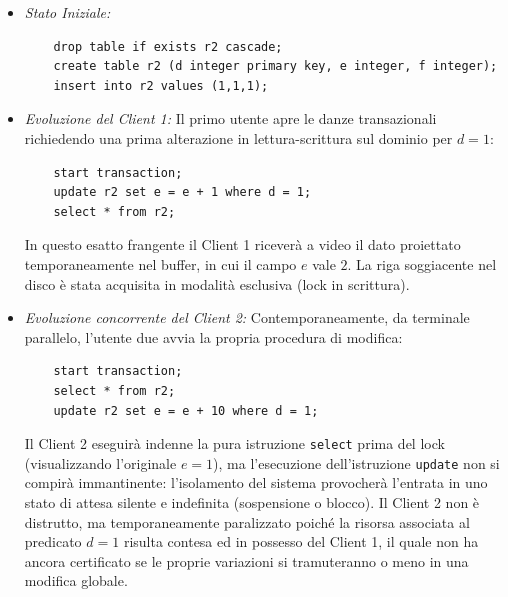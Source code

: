 \begin{itemize}
    \item \textit{Stato Iniziale:}
    \begin{verbatim}
    drop table if exists r2 cascade;
    create table r2 (d integer primary key, e integer, f integer);
    insert into r2 values (1,1,1);
    \end{verbatim}

    \item \textit{Evoluzione del Client 1:}
    Il primo utente apre le danze transazionali richiedendo una prima alterazione in lettura-scrittura sul dominio per $d=1$:
    \begin{verbatim}
    start transaction;
    update r2 set e = e + 1 where d = 1;
    select * from r2;
    \end{verbatim}
    In questo esatto frangente il Client 1 riceverà a video il dato proiettato temporaneamente nel buffer, in cui il campo $e$ vale $2$. La riga soggiacente nel disco è stata acquisita in modalità esclusiva (lock in scrittura).

    \item \textit{Evoluzione concorrente del Client 2:}
    Contemporaneamente, da terminale parallelo, l'utente due avvia la propria procedura di modifica:
    \begin{verbatim}
    start transaction;
    select * from r2;
    update r2 set e = e + 10 where d = 1;
    \end{verbatim}
    Il Client 2 eseguirà indenne la pura istruzione \texttt{select} prima del lock (visualizzando l'originale $e=1$), ma l'esecuzione dell'istruzione \texttt{update} non si compirà immantinente: l'isolamento del sistema provocherà l'entrata in uno stato di attesa silente e indefinita (sospensione o blocco). Il Client 2 non è distrutto, ma temporaneamente paralizzato poiché la risorsa associata al predicato $d=1$ risulta contesa ed in possesso del Client 1, il quale non ha ancora certificato se le proprie variazioni si tramuteranno o meno in una modifica globale.
\end{itemize}

